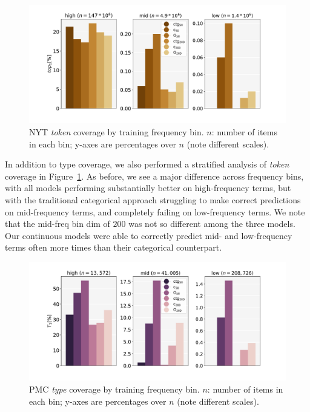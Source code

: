 \documentclass[11pt,a4paper]{article}
\begin{document}

\begin{figure}[h]
    \centering
    \includegraphics[width=0.47
    \textwidth]{fig/tokens_coverage_ny200.pdf}
    \caption{NYT \textit{token} coverage by training frequency bin. $n$: number of items in each bin; y-axes are percentages over $n$ (note different scales).}
    \vspace{-0.15in}
    \label{fig:token_coverage_ny}
\end{figure}

In addition to type coverage, we also performed a stratified analysis of \textit{token} coverage in Figure~\ref{fig:token_coverage_ny}. 
As before, we see a major difference across frequency bins, with all models performing substantially better on high-frequency terms, but with the traditional categorical approach struggling to make correct predictions on mid-frequency terms, and completely failing on low-frequency terms. 
We note that the mid-freq bin dim of $200$ was not so different among the three models. 
Our continuous models were able to correctly predict mid- and low-frequency terms often more times than their categorical counterpart.

\begin{figure}[h]
    \centering
    \includegraphics[width=0.47
    \textwidth]{fig/types_coverage_pb200.pdf}
    \caption{PMC \textit{type} coverage by training frequency bin. $n$: number of items in each bin; y-axes are percentages over $n$ (note different scales).}
    \vspace{-0.15in}
    \label{fig:type_coverage_pb}
\end{figure}
\end{document}
